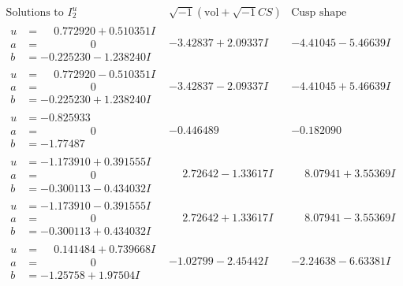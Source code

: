 \documentclass[1p]{elsarticle_modified}
\theoremstyle{definition}
\newcommand{\I}{\sqrt{-1}}
\begin{document}
$$\begin{array}{c|c|c}  
\text{Solutions to }I^u_{2}& \I (\text{vol} + \sqrt{-1}CS) & \text{Cusp shape}\\
 \hline 
\begin{aligned}
u &= \phantom{-}0.772920 + 0.510351 I \\
a &= \phantom{-0.000000 } 0 \\
b &= -0.225230 - 1.238240 I\end{aligned}
 & -3.42837 + 2.09337 I & -4.41045 - 5.46639 I \\ \hline\begin{aligned}
u &= \phantom{-}0.772920 - 0.510351 I \\
a &= \phantom{-0.000000 } 0 \\
b &= -0.225230 + 1.238240 I\end{aligned}
 & -3.42837 - 2.09337 I & -4.41045 + 5.46639 I \\ \hline\begin{aligned}
u &= -0.825933\phantom{ +0.000000I} \\
a &= \phantom{-0.000000 } 0 \\
b &= -1.77487\phantom{ +0.000000I}\end{aligned}
 & -0.446489\phantom{ +0.000000I} & -0.182090\phantom{ +0.000000I} \\ \hline\begin{aligned}
u &= -1.173910 + 0.391555 I \\
a &= \phantom{-0.000000 } 0 \\
b &= -0.300113 - 0.434032 I\end{aligned}
 & \phantom{-}2.72642 - 1.33617 I & \phantom{-}8.07941 + 3.55369 I \\ \hline\begin{aligned}
u &= -1.173910 - 0.391555 I \\
a &= \phantom{-0.000000 } 0 \\
b &= -0.300113 + 0.434032 I\end{aligned}
 & \phantom{-}2.72642 + 1.33617 I & \phantom{-}8.07941 - 3.55369 I \\ \hline\begin{aligned}
u &= \phantom{-}0.141484 + 0.739668 I \\
a &= \phantom{-0.000000 } 0 \\
b &= -1.25758 + 1.97504 I\end{aligned}
 & -1.02799 - 2.45442 I & -2.24638 - 6.63381 I \\ \hline\begin{aligned}

\end{aligned}
\end{array}$$
\end{document}
